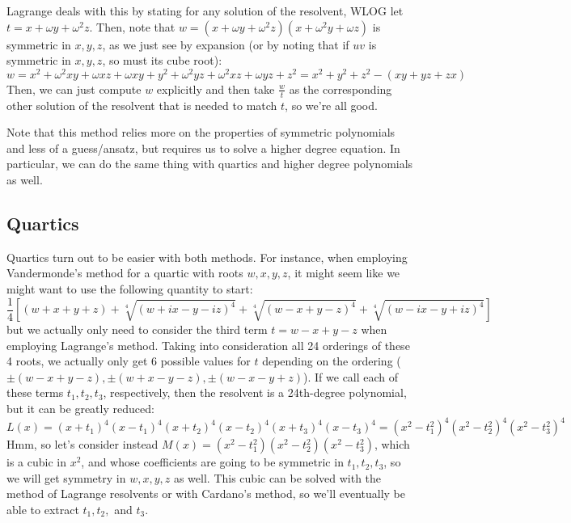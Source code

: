 \documentclass[12pt]{scrartcl}
\begin{document}
Lagrange deals with this by stating for any solution of the resolvent, WLOG let $t = x + \omega y + \omega^2 z$. Then, note that $w = (x + \omega y + \omega^2 z)(x + \omega^2 y + \omega z)$ is symmetric in $x, y, z$, as we just see by expansion (or by noting that if $uv$ is symmetric in $x, y, z$, so must its cube root): 
\[
    w = x^2 + \omega^2 xy + \omega xz + \omega xy + y^2 + \omega^2 yz + \omega^2 xz + \omega yz + z^2 = x^2 + y^2 + z^2 - (xy + yz + zx) 
\]
Then, we can just compute $w$ explicitly and then take $\frac w t$ as the corresponding other solution of the resolvent that is needed to match $t$, so we're all good. 

Note that this method relies more on the properties of symmetric polynomials and less of a guess/ansatz, but requires us to solve a higher degree equation. In particular, we can do the same thing with quartics and higher degree polynomials as well. 

\subsection{Quartics}
Quartics turn out to be easier with both methods. For instance, when employing Vandermonde's method for a quartic with roots $w, x, y, z$, it might seem like we might want to use the following quantity to start: 
\[
    \frac 14 [(w + x + y + z) + \sqrt[4]{(w + ix - y - iz)^4} + \sqrt[4]{(w - x + y - z)^4} + \sqrt[4]{(w - ix - y + iz)^4}]
\]
but we actually only need to consider the third term $t = w - x + y - z$ when employing Lagrange's method. Taking into consideration all 24 orderings of these 4 roots, we actually only get 6 possible values for $t$ depending on the ordering ($\pm (w - x + y - z), \pm (w + x - y - z), \pm (w - x - y + z)$). If we call each of these terms $t_1, t_2, t_3$, respectively, then the resolvent is a 24th-degree polynomial, but it can be greatly reduced: 
\[
    L(x) = (x + t_1)^4 (x - t_1)^4 (x + t_2)^4 (x - t_2)^4 (x + t_3)^4 (x - t_3)^4 = (x^2 - t_1^2)^4 (x^2 - t_2^2)^4 (x^2 - t_3^2)^4 
\]  
Hmm, so let's consider instead $M(x) = (x^2 - t_1^2) (x^2 - t_2^2)(x^2 - t_3^2)$, which is a cubic in $x^2$, and whose coefficients are going to be symmetric in $t_1, t_2, t_3$, so we will get symmetry in $w, x, y, z$ as well. This cubic can be solved with the method of Lagrange resolvents or with Cardano's method, so we'll eventually be able to extract $t_1, t_2,$ and $t_3$. 
\end{document}
